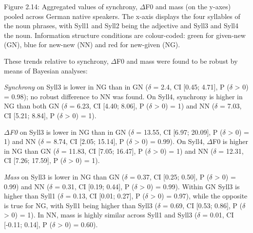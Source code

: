 \begin{stylecaption}
Figure 2.14: Aggregated values of synchrony, ${\Delta}$F0 and mass (on the y-axes) pooled across German native speakers. The x-axis displays the four syllables of the noun phrases, with Syll1 and Syll2 being the adjective and Syll3 and Syll4 the noun. Information structure conditions are colour-coded: green for given-new (GN), blue for new-new (NN) and red for new-given (NG).
\end{stylecaption}

\begin{styleStandard}
These trends relative to synchrony, ${\Delta}$F0 and mass were found to be robust by means of Bayesian analyses:
\end{styleStandard}

\begin{listWWNumiiileveli}
\item 
\begin{stylelsBulletList}
\textit{Synchrony }on Syll3 is lower in NG than in GN ($\delta $ = 2.4, CI [0.45; 4.71], P ($\delta $ {\textgreater} 0) = 0.98); no robust difference to NN was found. On Syll4, synchrony is higher in NG than both GN ($\delta $ = 6.23, CI [4.40; 8.06], P ($\delta $ {\textgreater} 0) = 1) and NN ($\delta $ = 7.03, CI [5.21; 8.84], P ($\delta $ {\textgreater} 0) = 1).
\end{stylelsBulletList}
\item 
\begin{stylelsBulletList}
\textit{${\Delta}$F0 }on Syll3 is lower in NG than in GN ($\delta $ = 13.55, CI [6.97; 20.09], P ($\delta $ {\textgreater} 0) = 1) and NN ($\delta $ = 8.74, CI [2.05; 15.14], P ($\delta $ {\textgreater} 0) = 0.99). On Syll4, ${\Delta}$F0 is higher in NG than GN ($\delta $ = 11.83, CI [7.05; 16.47], P ($\delta $ {\textgreater} 0) = 1) and NN ($\delta $ = 12.31, CI [7.26; 17.59], P ($\delta $ {\textgreater} 0) = 1).
\end{stylelsBulletList}
\item 
\begin{stylelsBulletList}
\textit{Mass }on Syll3 is lower in NG than GN ($\delta $ = 0.37, CI [0.25; 0.50], P ($\delta $ {\textgreater} 0) = 0.99) and NN ($\delta $ = 0.31, CI [0.19; 0.44], P ($\delta $ {\textgreater} 0) = 0.99). Within GN Syll3 is higher than Syll1 ($\delta $ = 0.13, CI [0.01; 0.27], P ($\delta $ {\textgreater} 0) = 0.97), while the opposite is true for NG, with Syll1 being higher than Syll3 ($\delta $ = 0.69, CI [0.53; 0.86], P ($\delta $ {\textgreater} 0) = 1). In NN, mass is highly similar across Syll1 and Syll3 ($\delta $ = 0.01, CI [-0.11; 0.14], P ($\delta $ {\textgreater} 0) = 0.60).
\end{stylelsBulletList}
\end{listWWNumiiileveli}
